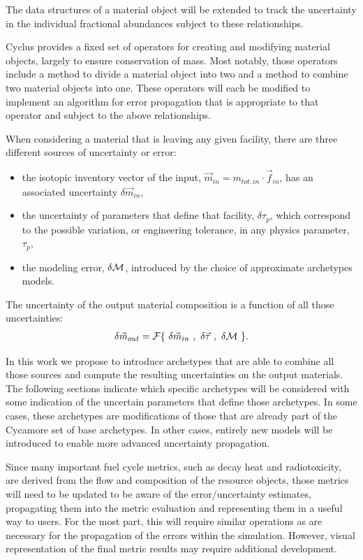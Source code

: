 \documentclass[dvips,12pt]{article}
\newcommand{\unc}[1]
{ \delta #1 }
\begin{document}
The data structures of a material object will be
extended to track the uncertainty in the
individual fractional abundances subject to these
relationships.

Cyclus provides a fixed set of operators for
creating and modifying material objects, largely
to ensure conservation of mass.  Most notably,
those operators include a method to divide a
material object into two and a method to combine
two material objects into one.  These operators
will each be modified to implement an algorithm
for error propagation that is appropriate to that
operator and subject to the above relationships.

When considering a material that is leaving any
given facility, there are three different sources
of uncertainty or error:
\begin{itemize}[nosep]
\item the isotopic inventory vector of the input,
  $\vec{m}_{in} = m_{tot,in} \cdot \vec{f}_{in}$,
  has an associated uncertainty $\unc{\vec{m}_{in}}$,
\item the uncertainty of parameters that define
that facility, $\unc{\tau_p}$, which correspond to
the possible  variation, or engineering tolerance,
in any physics parameter, $\tau_p$,
\item the modeling error, $\unc{{\cal M}}$,
introduced by the choice of approximate archetypes
models.
\end{itemize}
The uncertainty of the output material composition
is a function of all those uncertainties:
\begin{align}
  \delta \vec{m}_{out} = 
         {\cal F}\{~\unc{\vec{m}_{in}}~,~\unc{\vec{\tau}}~,~\unc{{\cal M}}~\}.
\end{align}

In this work we propose to introduce archetypes
that are able to combine all those sources and
compute the resulting uncertainties on the output
materials.  The following sections indicate which
specific archetypes will be considered with some
indication of the uncertain parameters that define
those archetypes.  In some cases, these archetypes
are modifications of those that are already part
of the Cycamore set of base archetypes.  In other
cases, entirely new models will be introduced to
enable more advanced uncertainty propagation.

Since many important fuel cycle metrics, such as
decay heat and radiotoxicity, are derived from the
flow and composition of the resource objects,
those metrics will need to be updated to be aware
of the error/uncertainty estimates, propagating
them into the metric evaluation and representing
them in a useful way to users.  For the most part,
this will require similar operations as are
necessary for the propagation of the errors within
the simulation.  However, visual representation of
the final metric results may require additional
development.
\end{document}
